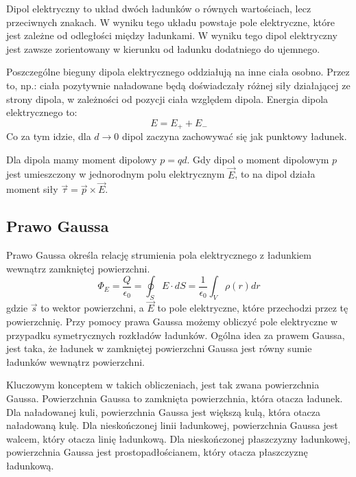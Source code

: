 \documentclass{../notatki}
\begin{document}
Dipol elektryczny to układ dwóch ładunków o równych wartościach, lecz
przeciwnych znakach. W wyniku tego układu powstaje pole elektryczne, które
jest zależne od odległości między ładunkami. W wyniku tego dipol elektryczny
jest zawsze zorientowany w kierunku od ładunku dodatniego do ujemnego.
\begin{figure}[h]
  \centering
\end{figure}

Poszczególne bieguny dipola elektrycznego oddziałują na inne ciała osobno.
Przez to, np.: ciała pozytywnie naładowane będą doświadczały różnej siły
działającej ze strony dipola, w zależności od pozycji ciała względem dipola.
Energia dipola elektrycznego to:
$$
E = E_+ + E_-
$$
Co za tym idzie, dla $d \rightarrow 0$ dipol zaczyna zachowywać się jak
punktowy ładunek.

Dla dipola mamy moment dipolowy $p = qd$. Gdy dipol o moment dipolowym $p$ jest
umieszczony w jednorodnym polu elektrycznym $\vec{E}$, to na dipol działa moment
siły $\vec{\tau} = \vec{p} \times \vec{E}$.

\subsection{Prawo Gaussa}

Prawo Gaussa określa relację strumienia pola elektrycznego z
ładunkiem wewnątrz zamkniętej powierzchni.
$$
\Phi_E = \frac{Q}{\epsilon_0} = \oint_S E \cdot dS = \frac{1}{\epsilon_0}
\int_V \rho(r) dr
$$
gdzie $\vec{s}$ to wektor powierzchni, a $\vec{E}$ to pole elektryczne, które
przechodzi przez tę powierzchnię. Przy pomocy prawa Gaussa możemy
obliczyć pole elektryczne w przypadku symetrycznych rozkładów ładunków.
Ogólna idea za prawem Gaussa, jest taka, że ładunek w zamkniętej powierzchni
Gaussa jest równy sumie ładunków wewnątrz powierzchni.

Kluczowym konceptem w takich obliczeniach, jest tak zwana powierzchnia
Gaussa. Powierzchnia Gaussa to zamknięta powierzchnia, która otacza
ładunek. Dla naładowanej kuli, powierzchnia Gaussa jest większą kulą, która
otacza naładowaną kulę. Dla nieskończonej linii ładunkowej, powierzchnia Gaussa
jest walcem, który otacza linię ładunkową. Dla nieskończonej płaszczyzny
ładunkowej, powierzchnia Gaussa jest prostopadłościanem, który otacza
płaszczyznę ładunkową.
\end{document}
